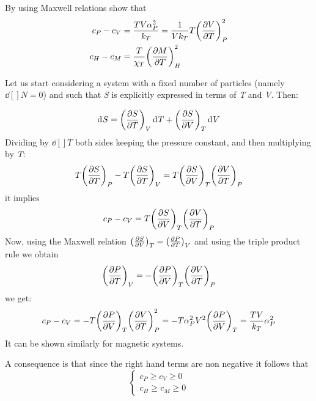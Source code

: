 \documentclass[../main/main.tex]{subfiles}
\begin{document}
\begin{exercise}
By using Maxwell relations show that
\begin{subequations}
\begin{align}
  c_P - c_V &= \frac{T V \alpha_P ^2}{k_T} = \frac{1}{V k_T} T \qty(\pdv{V}{T} )_P^2 \\
  c_H - c_M &= \frac{T}{\chi _T} \qty(\pdv{M}{T} )_H^2
\end{align}
\end{subequations}
\begin{solution}
Let us start considering a system with a fixed number of particles (namely \( \dd[]{N} =0  \)) and such that \emph{S}  is explicitly expressed in terms of \emph{T}  and \emph{V}.
Then:

\begin{equation*}
  \dd[]{S} = \qty(\pdv{S}{T})_V \dd[]{T} + \qty(\pdv{S}{V} )_T \dd[]{V}
\end{equation*}
Dividing by \( \dd[]{T}  \) both sides keeping the pressure constant, and then multiplying by \emph{T}:
\begin{equation*}
  T \qty(\pdv{S}{T} )_P - T \qty(\pdv{S}{T} )_V = T \qty(\pdv{S}{V} )_T \qty(\pdv{V}{T} )_P
\end{equation*}
it implies
\begin{equation*}
  c_P - c_V = T \qty(\pdv{S}{V} )_T \qty(\pdv{V}{T} )_P
\end{equation*}
Now, using the Maxwell relation \( \qty(\pdv{S}{V} )_T = \qty(\pdv{P}{T} )_V   \) and using the triple product rule we obtain
\begin{equation*}
  \qty(\pdv{P}{T} )_V = - \qty(\pdv{P}{V} )_T \qty(\pdv{V}{T} )_P
\end{equation*}
we get:
\begin{equation*}
  c_P-c_V = - T \qty(\pdv{P}{V} )_T \qty(\pdv{V}{T} )_P^2 =
  -T  \alpha_P^2 V^2 \qty(\pdv{P}{V} )_T
  =\frac{T V}{k_T} \alpha_P^2
\end{equation*}
It can be shown similarly for magnetic systems.
\end{solution}
\end{exercise}


 A consequence is that since the right hand terms are non negative it follows that
\begin{equation}
  \begin{cases}
   c_P \ge c_V \ge 0  \\
   c_H \ge c_M \ge 0
  \end{cases}
\label{eq:}
\end{equation}
\end{document}
